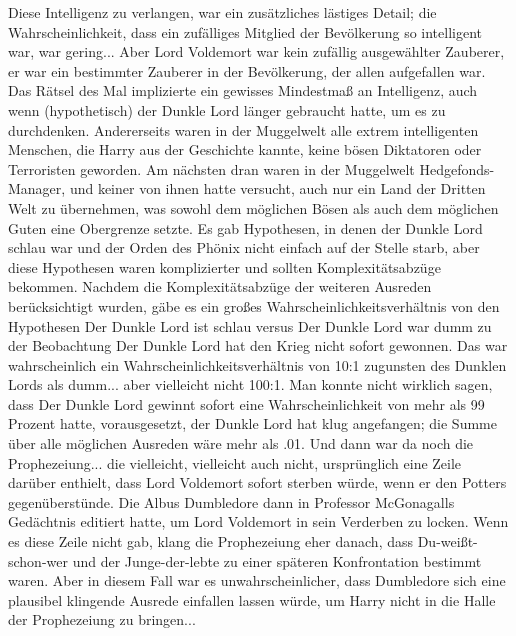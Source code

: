Diese Intelligenz zu verlangen, war ein zusätzliches lästiges Detail; die
Wahrscheinlichkeit, dass ein zufälliges Mitglied der Bevölkerung so intelligent
war, war gering... Aber Lord Voldemort war kein zufällig ausgewählter Zauberer,
er war ein bestimmter Zauberer in der Bevölkerung, der allen aufgefallen war.
Das Rätsel des Mal implizierte ein gewisses Mindestmaß an Intelligenz, auch wenn
(hypothetisch) der Dunkle Lord länger gebraucht hatte, um es zu durchdenken.
Andererseits waren in der Muggelwelt alle extrem intelligenten Menschen, die
Harry aus der Geschichte kannte, keine bösen Diktatoren oder Terroristen
geworden. Am nächsten dran waren in der Muggelwelt Hedgefonds-Manager, und
keiner von ihnen hatte versucht, auch nur ein Land der Dritten Welt zu
übernehmen, was sowohl dem möglichen Bösen als auch dem möglichen Guten eine
Obergrenze setzte. Es gab Hypothesen, in denen der Dunkle Lord schlau war und
der Orden des Phönix nicht einfach auf der Stelle starb, aber diese Hypothesen
waren komplizierter und sollten Komplexitätsabzüge bekommen. Nachdem die
Komplexitätsabzüge der weiteren Ausreden berücksichtigt wurden, gäbe es ein
großes Wahrscheinlichkeitsverhältnis von den Hypothesen \glqq{}Der Dunkle Lord
ist schlau\grqq{} versus \glqq{}Der Dunkle Lord war dumm\grqq{} zu der
Beobachtung \glqq{}Der Dunkle Lord hat den Krieg nicht sofort gewonnen\grqq{}.
Das war wahrscheinlich ein Wahrscheinlichkeitsverhältnis von 10:1 zugunsten des
Dunklen Lords als dumm... aber vielleicht nicht 100:1. Man konnte nicht wirklich
sagen, dass \glqq{}Der Dunkle Lord gewinnt sofort\grqq{} eine Wahrscheinlichkeit
von mehr als 99 Prozent hatte, vorausgesetzt, der Dunkle Lord hat klug
angefangen; die Summe über alle möglichen Ausreden wäre mehr als .01. Und dann
war da noch die Prophezeiung... die vielleicht, vielleicht auch nicht,
ursprünglich eine Zeile darüber enthielt, dass Lord Voldemort sofort sterben
würde, wenn er den Potters gegenüberstünde. Die Albus Dumbledore dann in
Professor McGonagalls Gedächtnis editiert hatte, um Lord Voldemort in sein
Verderben zu locken. Wenn es diese Zeile nicht gab, klang die Prophezeiung eher
danach, dass Du-weißt-schon-wer und der Junge-der-lebte zu einer späteren
Konfrontation bestimmt waren. Aber in diesem Fall war es unwahrscheinlicher,
dass Dumbledore sich eine plausibel klingende Ausrede einfallen lassen würde, um
Harry nicht in die Halle der Prophezeiung zu bringen...


